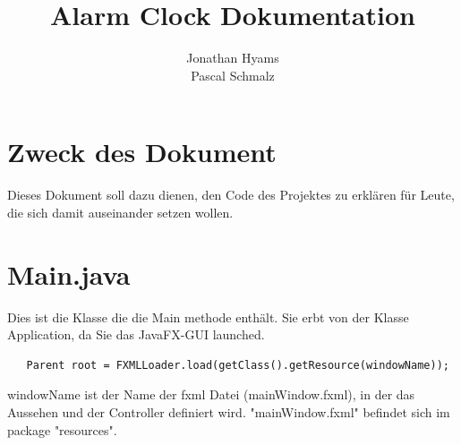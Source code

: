 \documentclass[11pt,titelpage]{scrartcl}
\title{Alarm Clock Dokumentation}
\author{Jonathan Hyams \\Pascal Schmalz}
\begin{document}
\thispagestyle{empty}
\maketitle
\pagebreak
\tableofcontents

\pagestyle{fancy}


\begin{abstract}
\end{abstract}
\pagebreak

\section{Zweck des Dokument}
Dieses Dokument soll dazu dienen, den Code des Projektes zu erklären für Leute, die sich damit auseinander setzen wollen.

\section{Main.java}
Dies ist die Klasse die die Main methode enthält. Sie erbt von der Klasse Application, da Sie das JavaFX-GUI launched.
\begin{lstlisting}
   Parent root = FXMLLoader.load(getClass().getResource(windowName));
\end{lstlisting}
windowName ist der Name der fxml Datei (mainWindow.fxml), in der das Aussehen und der Controller definiert wird. "mainWindow.fxml" befindet sich im package "resources".
\end{document}
